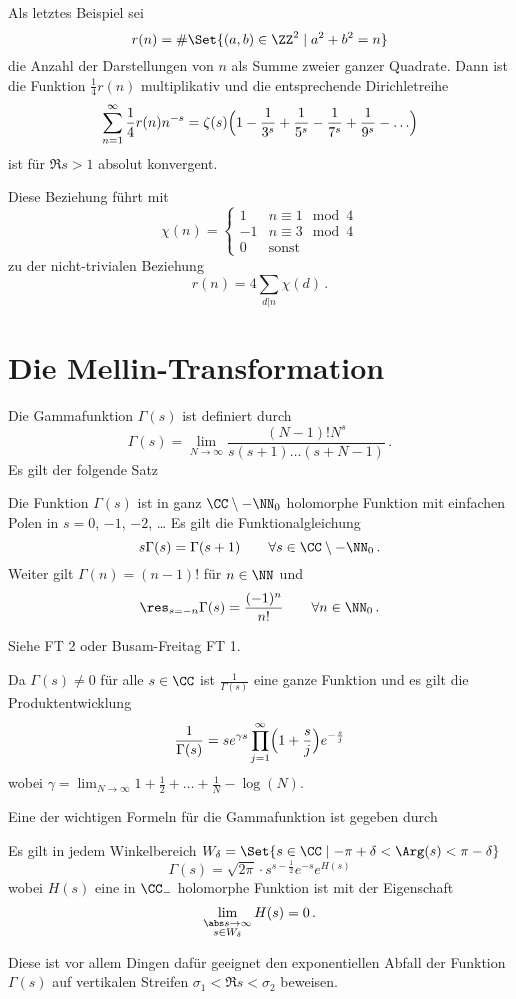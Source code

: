 Als letztes Beispiel sei
\[
	r(n) = \# \Set{ (a,b) \in \ZZ^2 \mid a^2 + b^2 = n}
\]
die Anzahl der Darstellungen von $n$ als Summe zweier ganzer Quadrate.
Dann ist die Funktion $\frac{1}{4}r(n)$ multiplikativ und die entsprechende Dirichletreihe
\[
	\sum_{n=1}^\infty \frac{1}{4} r(n) n^{-s}
	= \zeta(s) \Bigl( 1 - \frac{1}{3^s} + \frac{1}{5^s} - \frac{1}{7^s} + \frac{1}{9^s} - \ldots \Bigr)
\]
ist für $\Re s > 1$ absolut konvergent.

Diese Beziehung führt mit 
\[
	\chi(n)
	= \begin{cases}
		1 & n \equiv 1 \mod 4 \\
		-1 & n \equiv 3 \mod 4 \\
		0 & \text{sonst}
	\end{cases}
\]
zu der nicht-trivialen Beziehung
\[
	r(n) = 4\sum_{d|n} \chi(d)
	\,.
\]

\section{Die Mellin-Transformation}

\begin{erin}
	Die Gammafunktion $\Gamma(s)$ ist definiert durch
	\[
		\Gamma(s) = \lim_{N\to\infty} \frac{(N-1)!N^s}{s(s+1) \ldots (s+N-1)}\,.
	\]
	Es gilt der folgende Satz
	\begin{satz}
		Die Funktion $\Gamma(s)$ ist in ganz $\CC\setminus-\NN_0$ holomorphe Funktion mit einfachen Polen in $s=0$, $-1$, $-2$, \ldots{}
		Es gilt die Funktionalgleichung
		\[
			s\Gamma(s) = \Gamma(s+1) \qquad \forall s \in \CC\setminus-\NN_0\,.
		\]
		Weiter gilt $\Gamma(n) = (n-1)!$ für $n \in \NN$ und
		\[
			\res_{s=-n} \Gamma(s) = \frac{(-1)^n}{n!}
			\qquad \forall n \in \NN_0\,.
		\]
	\end{satz}
	\begin{bewe}
		Siehe FT 2 oder Busam-Freitag FT 1.
	\end{bewe}

	Da $\Gamma(s) \not= 0$ für alle $s \in \CC$ ist $\frac{1}{\Gamma(s)}$ eine ganze Funktion und es gilt die Produktentwicklung
	\[
		\frac{1}{\Gamma(s)} = s e^{\gamma s} \prod_{j=1}^\infty \Bigl(1 + \frac{s}{j}\Bigr)e^{-\frac{s}{j}}
	\]
	wobei $\gamma = \lim_{N \to \infty} 1 + \frac{1}{2} + \ldots + \frac{1}{N} - \log(N)$.
	
	Eine der wichtigen Formeln für die Gammafunktion ist gegeben durch
	\begin{satz}
		Es gilt in jedem Winkelbereich $W_\delta = \Set{s \in \CC \mid -\pi + \delta < \Arg(s) < \pi - \delta}$
		\[
			\Gamma(s)
			= \sqrt{2\pi} \cdot s^{s - \frac{1}{2}} e^{-s} e^{H(s)}
		\]
		wobei $H(s)$ eine in $\CC_-$ holomorphe Funktion ist mit der Eigenschaft
		\[
			\lim_{\substack{\abs s \to \infty \\ s \in W_\delta}} H(s) = 0\,.
		\]
	\end{satz}
	Diese ist vor allem Dingen dafür geeignet den exponentiellen Abfall der Funktion $\Gamma(s)$ auf vertikalen Streifen $\sigma_1 < \Re s < \sigma_2$ beweisen.
\end{erin}
